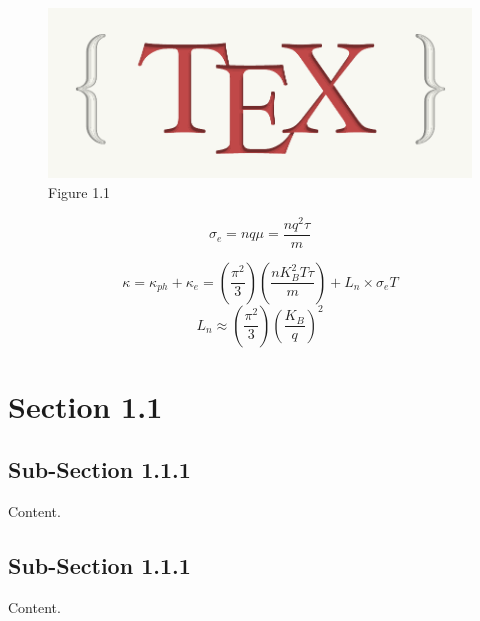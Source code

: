 \justify
\skipspace
\begin{figure}[!ht]
    \centering
    \includegraphics[scale=0.25]{images/logo.png}
    \caption{Figure 1.1}
    \label{Fig: 1.1}
\end{figure}

\begin{center}
    \begin{equation}
        \sigma_e  = nq\mu = \frac{nq^2\tau}{m}
        \label{Eqn: 1.2}
    \end{equation}
\end{center}

\begin{center}
    \begin{equation}
        \kappa  = \kappa_{ph} + \kappa_e = (\frac{\pi^2}{3})(\frac{nK_B^2T\tau}{m}) + L_n\times \sigma_eT
        \label{Eqn: 1.3}
    \end{equation}
    \begin{equation}
        L_n \approx (\frac{\pi^2}{3})(\frac{K_B}{q})^2
        \label{Eqn: 1.4}
    \end{equation}
\end{center}

\section{Section 1.1}
\subsection{Sub-Section 1.1.1}
\justify
\skipspace Content.

\subsection{Sub-Section 1.1.1}
\justify
\skipspace Content.

